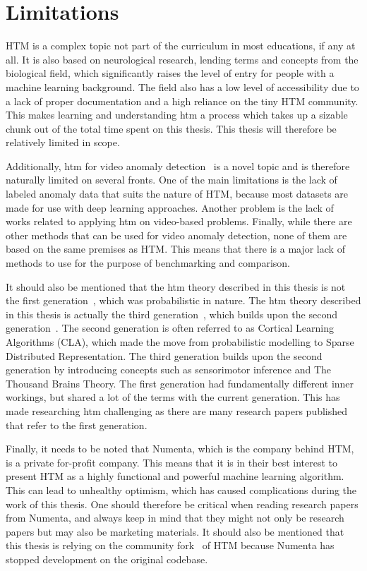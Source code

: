 \section{Limitations}
HTM is a complex topic not part of the curriculum in most educations, if any at all. It is also based on neurological research, lending terms and concepts from the biological field, which significantly raises the level of entry for people with a machine learning background. The field also has a low level of accessibility due to a lack of proper documentation and a high reliance on the tiny HTM community. This makes learning and understanding \gls*{htm} a process which takes up a sizable chunk out of the total time spent on this thesis. This thesis will therefore be relatively limited in scope.
\par
Additionally, \gls*{htm} for video anomaly detection~\cite{MotionAnomalyDetection} is a novel topic and is therefore naturally limited on several fronts. One of the main limitations is the lack of labeled anomaly data that suits the nature of HTM, because most datasets are made for use with deep learning approaches. Another problem is the lack of works related to applying \gls*{htm} on video-based problems. Finally, while there are other methods that can be used for video anomaly detection, none of them are based on the same premises as HTM. This means that there is a major lack of methods to use for the purpose of benchmarking and comparison.
\par
It should also be mentioned that the \gls*{htm} theory described in this thesis is not the first generation~\cite{htm_zeta1}, which was probabilistic in nature. The \gls*{htm} theory described in this thesis is actually the third generation~\cite{htm_gen3, thousandbrains}, which builds upon the second generation~\cite{htm_gen2_sp,htm_gen2_tm}. The second generation is often referred to as Cortical Learning Algorithms (CLA), which made the move from probabilistic modelling to Sparse Distributed Representation. The third generation builds upon the second generation by introducing concepts such as sensorimotor inference and The Thousand Brains Theory. The first generation had fundamentally different inner workings, but shared a lot of the terms with the current generation. This has made researching  \gls*{htm} challenging as there are many research papers published that refer to the first generation.
\par
Finally, it needs to be noted that Numenta, which is the company behind HTM, is a private for-profit company. This means that it is in their best interest to present HTM as a highly functional and powerful machine learning algorithm. This can lead to unhealthy optimism, which has caused complications during the work of this thesis. One should therefore be critical when reading research papers from Numenta, and always keep in mind that they might not only be research papers but may also be marketing materials. It should also be mentioned that this thesis is relying on the community fork~\cite{htm_community_fork} of HTM because Numenta has stopped development on the original codebase.

